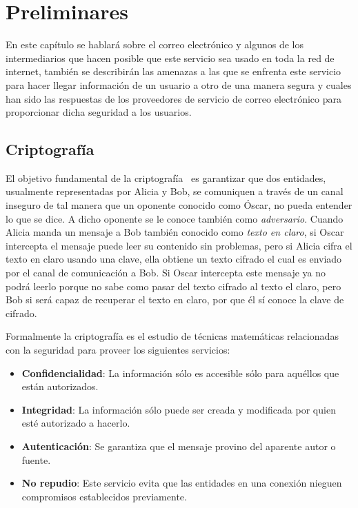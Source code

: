 \chapter{Preliminares} %
En  este  capítulo  se hablará  sobre  el  correo  electrónico  y  algunos  de  los intermediarios que hacen posible que este servicio sea usado en toda la red de  internet, también  se describirán las  amenazas a  las  que  se   enfrenta  este  servicio para  hacer  llegar  información  de  un  usuario  a  otro  de  una  manera  segura  y  cuales  han 
sido   las   respuestas   de   los   proveedores   de   servicio   de   correo   electrónico   para proporcionar dicha seguridad a los usuarios. 

\section{Criptografía}


El objetivo fundamental de la criptografía~\cite{stinson} es garantizar que dos entidades, 
usualmente representadas por Alicia y Bob, se comuniquen a trav\'es de un canal inseguro de tal manera que un oponente conocido como \'Oscar, no pueda entender lo que se dice. A dicho oponente se le conoce tambi\'en como
{\it adversario}.
Cuando Alicia manda un mensaje a Bob tambi\'en conocido como {\it texto en claro}, si Oscar intercepta el mensaje puede leer su contenido sin problemas, pero si Alicia cifra el texto en claro usando una clave, ella obtiene un texto cifrado el cual es enviado por el canal de comunicación a Bob. Si Oscar intercepta este mensaje ya no podr\'a leerlo porque no sabe como pasar del texto cifrado al texto el claro, pero Bob si ser\'a capaz de recuperar el texto en claro, por que él sí conoce la clave de cifrado.

Formalmente la criptografía \cite{cri} es el estudio de técnicas matemáticas relacionadas con la seguridad para proveer los
siguientes servicios:
\begin{itemize}
 \item \textbf{Confidencialidad}:  La  información  sólo es  accesible  sólo  para  aquéllos  que  están autorizados.
 \item \textbf{Integridad}:  La información sólo puede ser creada y modificada por quien esté autorizado a hacerlo.
 \item \textbf{Autenticación}: Se garantiza que el mensaje provino del aparente autor o fuente.
 \item \textbf{No repudio}:  Este servicio evita que las entidades en una conexión nieguen compromisos establecidos previamente.
\end{itemize}

